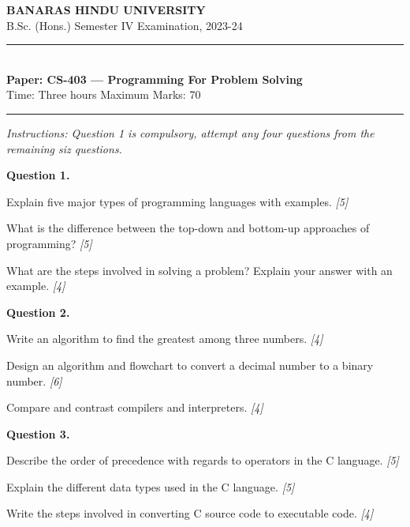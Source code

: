 \documentclass[11pt,a4paper]{article}
\newcommand{\pts}[1]{\hfill   \textit{[#1]}}
\begin{document}
\begin{center}
  {\large\bfseries BANARAS HINDU UNIVERSITY}\\[2pt]
  {\normalsize B.Sc. (Hons.) Semester IV Examination, 2023-24}\\[6pt]
  \rule{0.8\linewidth}{0.5pt}\\[6pt]
  {\large\bfseries Paper: CS-403 --- Programming For Problem Solving}\\[4pt]
  {\normalsize Time: Three hours \hfill Maximum Marks: 70}
\end{center}

\rule{\linewidth}{0.4pt}

\smallskip



\noindent   \textit{Instructions: Question 1 is compulsory, attempt any four questions from the remaining siz questions.}

\bigskip

\medskip


\noindent   \textbf{Question 1.}

\begin{parts}
  \item Explain five major types of programming languages with examples. \pts{5}
  \item What is the difference between the top-down and bottom-up approaches of programming? \pts{5}
  \item What are the steps involved in solving a problem? Explain your answer with an example. \pts{4}
\end{parts}

\medskip


\noindent   \textbf{Question 2.}

\begin{parts}
  \item Write an algorithm to find the greatest among three numbers. \pts{4}
  \item Design an algorithm and flowchart to convert a decimal number to a binary number. \pts{6}
  \item Compare and contrast compilers and interpreters. \pts{4}
\end{parts}

\medskip


\noindent   \textbf{Question 3.}

\begin{parts}
  \item Describe the order of precedence with regards to operators in the C language. \pts{5}
  \item Explain the different data types used in the C language. \pts{5}
  \item Write the steps involved in converting C source code to executable code. \pts{4}
\end{parts}
\end{document}
